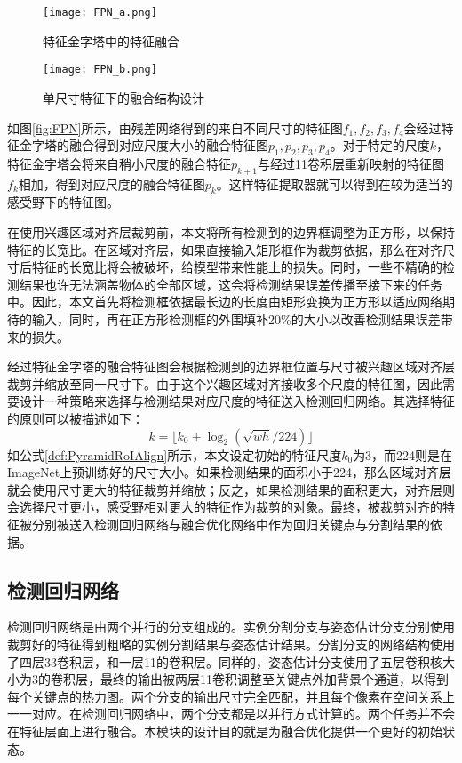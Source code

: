\begin{figure*}[htbp]	
	\centering
	\begin{subfigure}[b]{0.4\textwidth}
		\texttt{[image: FPN\_a.png]}
		\caption{特征金字塔中的特征融合}
	\end{subfigure}
	\hskip1.5cm
	\begin{subfigure}[b]{0.4\textwidth}
		\texttt{[image: FPN\_b.png]}
		\caption{单尺寸特征下的融合结构设计}
	\end{subfigure}
	\caption{特征金字塔中的结构设计}
	\label{fig:FPN}
\end{figure*}

如图\ref{fig:FPN}所示，由残差网络得到的来自不同尺寸的特征图$f_1, f_2, f_3, f_4$会经过特征金字塔的融合得到对应尺度大小的融合特征图$p_1, p_2, p_3, p_4$。对于特定的尺度$k$，特征金字塔会将来自稍小尺度的融合特征$p_{k+1}$与经过1\times1卷积层重新映射的特征图$f_k$相加，得到对应尺度的融合特征图$p_k$。这样特征提取器就可以得到在较为适当的感受野下的特征图。

在使用兴趣区域对齐层裁剪前，本文将所有检测到的边界框调整为正方形，以保持特征的长宽比。在区域对齐层，如果直接输入矩形框作为裁剪依据，那么在对齐尺寸后特征的长宽比将会被破坏，给模型带来性能上的损失。同时，一些不精确的检测结果也许无法涵盖物体的全部区域，这会将检测结果误差传播至接下来的任务中。因此，本文首先将检测框依据最长边的长度由矩形变换为正方形以适应网络期待的输入，同时，再在正方形检测框的外围填补20\%的大小以改善检测结果误差带来的损失。

经过特征金字塔的融合特征图会根据检测到的边界框位置与尺寸被兴趣区域对齐层裁剪并缩放至同一尺寸下。由于这个兴趣区域对齐接收多个尺度的特征图，因此需要设计一种策略来选择与检测结果对应尺度的特征送入检测回归网络。其选择特征的原则可以被描述如下：
\begin{equation}
\label{def:PyramidRoIAlign}
k =\lfloor k_0 + \log_{2}(\sqrt{wh} / 224) \rfloor
\end{equation}
如公式\eqref{def:PyramidRoIAlign}所示，本文设定初始的特征尺度$k_0$为3，而224则是在ImageNet上预训练好的尺寸大小。如果检测结果的面积小于224，那么区域对齐层就会使用尺寸更大的特征裁剪并缩放；反之，如果检测结果的面积更大，对齐层则会选择尺寸更小，感受野相对更大的特征作为裁剪的对象。最终，被裁剪对齐的特征被分别被送入检测回归网络与融合优化网络中作为回归关键点与分割结果的依据。

\subsection{检测回归网络}
\label{subsec:detection}
检测回归网络是由两个并行的分支组成的。实例分割分支与姿态估计分支分别使用裁剪好的特征得到粗略的实例分割结果与姿态估计结果。分割分支的网络结构使用了四层3\times3卷积层，和一层1\times1的卷积层。同样的，姿态估计分支使用了五层卷积核大小为3的卷积层，最终的输出被两层1\times1卷积调整至关键点外加背景个通道，以得到每个关键点的热力图。两个分支的输出尺寸完全匹配，并且每个像素在空间关系上一一对应。在检测回归网络中，两个分支都是以并行方式计算的。两个任务并不会在特征层面上进行融合。本模块的设计目的就是为融合优化提供一个更好的初始状态。


